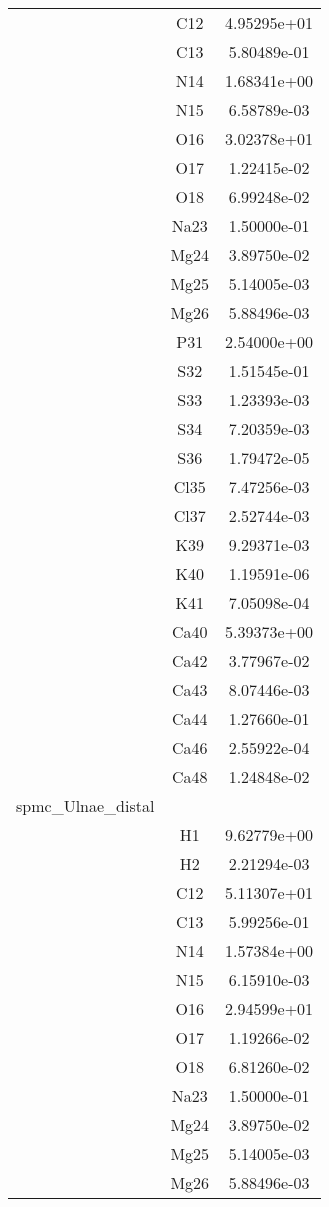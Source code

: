 \begin{centering}
\begin{longtable}{l c c}
& C12 & 4.95295e+01 \\ 
& C13 & 5.80489e-01 \\ 
& N14 & 1.68341e+00 \\ 
& N15 & 6.58789e-03 \\ 
& O16 & 3.02378e+01 \\ 
& O17 & 1.22415e-02 \\ 
& O18 & 6.99248e-02 \\ 
& Na23 & 1.50000e-01 \\ 
& Mg24 & 3.89750e-02 \\ 
& Mg25 & 5.14005e-03 \\ 
& Mg26 & 5.88496e-03 \\ 
& P31 & 2.54000e+00 \\ 
& S32 & 1.51545e-01 \\ 
& S33 & 1.23393e-03 \\ 
& S34 & 7.20359e-03 \\ 
& S36 & 1.79472e-05 \\ 
& Cl35 & 7.47256e-03 \\ 
& Cl37 & 2.52744e-03 \\ 
& K39 & 9.29371e-03 \\ 
& K40 & 1.19591e-06 \\ 
& K41 & 7.05098e-04 \\ 
& Ca40 & 5.39373e+00 \\ 
& Ca42 & 3.77967e-02 \\ 
& Ca43 & 8.07446e-03 \\ 
& Ca44 & 1.27660e-01 \\ 
& Ca46 & 2.55922e-04 \\ 
& Ca48 & 1.24848e-02 \\ 
\hline
spmc_Ulnae_distal & & \\
\hline
& H1 & 9.62779e+00 \\ 
& H2 & 2.21294e-03 \\ 
& C12 & 5.11307e+01 \\ 
& C13 & 5.99256e-01 \\ 
& N14 & 1.57384e+00 \\ 
& N15 & 6.15910e-03 \\ 
& O16 & 2.94599e+01 \\ 
& O17 & 1.19266e-02 \\ 
& O18 & 6.81260e-02 \\ 
& Na23 & 1.50000e-01 \\ 
& Mg24 & 3.89750e-02 \\ 
& Mg25 & 5.14005e-03 \\ 
& Mg26 & 5.88496e-03 \\ 

\end{longtable}
\end{centering}
